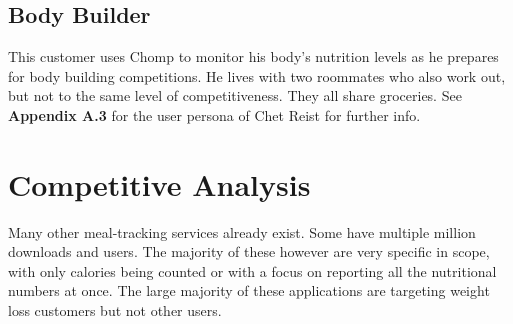 \documentclass[a4paper,12pt]{article}
\begin{document}
\subsection{Body Builder}
This customer uses Chomp to monitor his body's nutrition levels as he prepares for body building competitions.  He lives with two roommates who also work out, but not to the same level of competitiveness.  They all share groceries.  See \textbf{Appendix A.3} for the user persona of Chet Reist for further info.
\section{Competitive Analysis}
Many other meal-tracking services already exist.  Some have multiple million downloads and users.  The majority of these however are very specific in scope, with only calories being counted or with a focus on reporting all the nutritional numbers at once.  The large majority of these applications are targeting weight loss customers but not other users.\\
\\
\end{document}
